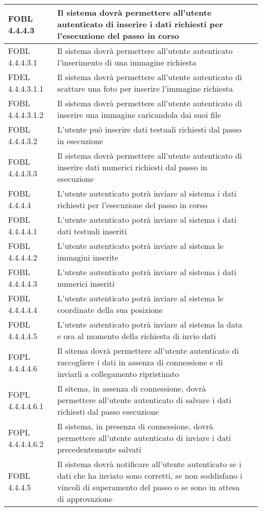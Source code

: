 \begin{longtable}{lXl}
\midrule
FOBL 4.4.4.3&Il sistema dovrà permettere all'utente autenticato di inserire i dati richiesti per l'esecuzione del passo in corso&\\
\midrule
FOBL 4.4.4.3.1&Il sistema dovrà permettere all'utente autenticato l'inserimento di una immagine richiesta&\\
\midrule
FDEL 4.4.4.3.1.1&Il sistema dovrà permettere all'utente autenticato di scattare una foto per inserire l'immagine richiesta&\\
\midrule
FOBL 4.4.4.3.1.2&Il sistema dovrà permettere all'utente autenticato di inserire una immagine caricandola dai suoi file&\\
\midrule
FOBL 4.4.4.3.2&L'utente può inserire dati testuali richiesti dal passo in esecuzione&\\
\midrule
FOBL 4.4.4.3.3&Il sistema dovrà permettere all'utente autenticato di inserire dati numerici richiesti dal passo in esecuzione&\\
\midrule
FOBL 4.4.4.4&L'utente autenticato potrà inviare al sistema i dati richiesti per l'esecuzione del passo in corso&\\
\midrule
FOBL 4.4.4.4.1&L'utente autenticato potrà inviare al sistema i dati dati testuali inseriti&\\
\midrule
FOBL 4.4.4.4.2&L'utente autenticato potrà inviare al sistema le immagini inserite&\\
\midrule
FOBL 4.4.4.4.3&L'utente autenticato potrà inviare al sistema i dati numerici inseriti&\\
\midrule
FOBL 4.4.4.4.4&L'utente autenticato potrà inviare al sistema le coordinate della sua posizione&\\
\midrule
FOBL 4.4.4.4.5&L'utente autenticato potrà inviare al sistema la data e ora al momento della richiesta di invio dati&\\
\midrule
FOPL 4.4.4.4.6&Il sitema dovrà permettere all'utente autenticato di raccogliere i dati in assenza di connessione e di inviarli a collegamento ripristinato&\\
\midrule
FOPL 4.4.4.4.6.1&Il sitema, in assenza di connessione, dovrà permettere all'utente autenticato di salvare i dati richiesti dal passo esecuzione&\\
\midrule
FOPL 4.4.4.4.6.2&Il sistema, in presenza di connessione, dovrà permettere all'utente autenticato di inviare i dati precedentemente salvati&\\
\midrule
FOBL 4.4.4.5&Il sistema dovrà notificare all'utente autenticato se i dati che ha inviato sono corretti, se non soddisfano i vincoli di superamento del passo o se sono in attesa di approvazione&\\

\end{longtable}
